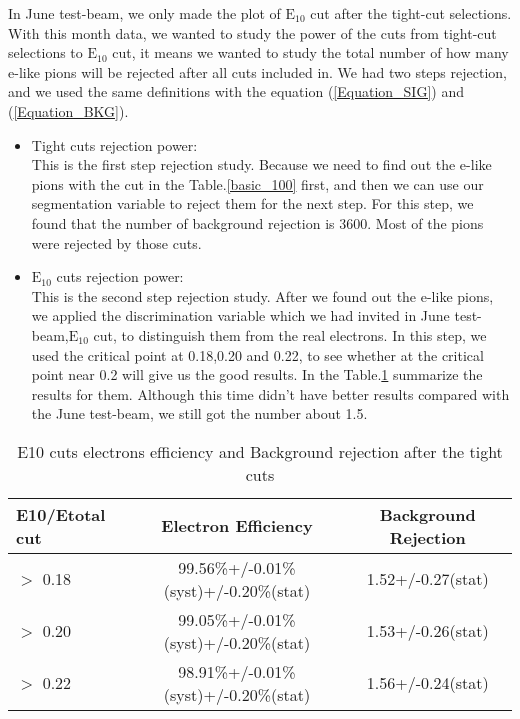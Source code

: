 \documentclass[12pt,twoside,a4paper,an,final]{cms-tdr}
\begin{document}
In June test-beam, we only made the plot of $\mathrm{E_{10}}$ cut after the tight-cut selections. With this month data, we wanted to study the power of the cuts from tight-cut selections to $\mathrm{E_{10}}$ cut, it means we wanted to study the total number of how many e-like pions will be rejected after all cuts included in.  We had two steps rejection, and we used the same definitions with the equation (\ref{Equation_SIG}) and (\ref{Equation_BKG}).
\begin{itemize}
\item Tight cuts rejection power: \\ 
This is the first step rejection study. Because we need to find out the e-like pions with the cut in the Table.\ref{basic_100} first, and then we can use our segmentation variable to reject them for the next step.  For this step, we found that the number of background rejection is 3600. Most of the pions were rejected by those cuts.
\item $\mathrm{E_{10}}$ cuts rejection power:\\
This is the second step rejection study. After we found out the e-like pions, we applied the discrimination variable which we had invited in June test-beam,$\mathrm{E_{10}}$ cut, to distinguish them from the real electrons. In this step, we used the critical point at 0.18,0.20 and 0.22, to see whether at the critical point near 0.2 will give us the good results. In the Table.\ref{basic_7} summarize the results for them. 
Although this time didn't have better results compared with the June test-beam, we still got the number about 1.5.
\end{itemize}
\begin{table}[h]%
    \centering
    \begin{tabular}{|l|c|c|}
    \hline
    E10/Etotal cut & Electron Efficiency & Background Rejection\\\hline
    $>$ 0.18 &  99.56\%+/-0.01\%(syst)+/-0.20\%(stat) &  1.52+/-0.27(stat)\\\hline  
    $>$ 0.20 &  99.05\%+/-0.01\%(syst)+/-0.20\%(stat) &  1.53+/-0.26(stat)\\\hline  
    $>$ 0.22 &  98.91\%+/-0.01\%(syst)+/-0.20\%(stat) &  1.56+/-0.24(stat)\\\hline  
        \end{tabular}
    \caption{E10 cuts electrons efficiency and Background rejection after the tight cuts}\label{basic_7}  %
\end{table}
\end{document}
